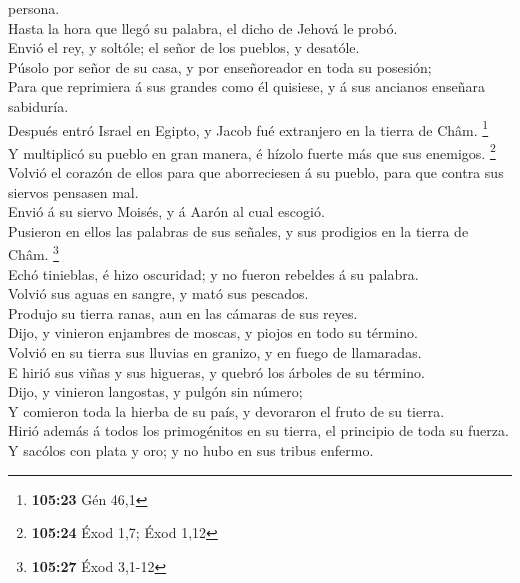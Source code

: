 persona.\\
 Hasta la hora que llegó su palabra, el dicho de Jehová
le probó.\\
 Envió el rey, y soltóle; el señor de los pueblos, y
desatóle.\\
 Púsolo por señor de su casa, y por enseñoreador en toda
su posesión;\\
 Para que reprimiera á sus grandes como él quisiese, y á
sus ancianos enseñara sabiduría.\\
 Después entró Israel en Egipto, y Jacob fué extranjero
en la tierra de Châm. \footnote{\textbf{105:23} Gén 46,1}\\
 Y multiplicó su pueblo en gran manera, é hízolo fuerte
más que sus enemigos. \footnote{\textbf{105:24} Éxod 1,7; Éxod 1,12}\\
 Volvió el corazón de ellos para que aborreciesen á su
pueblo, para que contra sus siervos pensasen mal.\\
 Envió á su siervo Moisés, y á Aarón al cual escogió.\\
 Pusieron en ellos las palabras de sus señales, y sus
prodigios en la tierra de Châm. \footnote{\textbf{105:27} Éxod 3,1-12}\\
 Echó tinieblas, é hizo oscuridad; y no fueron rebeldes á
su palabra.\\
 Volvió sus aguas en sangre, y mató sus pescados.\\
 Produjo su tierra ranas, aun en las cámaras de sus
reyes.\\
 Dijo, y vinieron enjambres de moscas, y piojos en todo
su término.\\
 Volvió en su tierra sus lluvias en granizo, y en fuego
de llamaradas.\\
 E hirió sus viñas y sus higueras, y quebró los árboles
de su término.\\
 Dijo, y vinieron langostas, y pulgón sin número;\\
 Y comieron toda la hierba de su país, y devoraron el
fruto de su tierra.\\
 Hirió además á todos los primogénitos en su tierra, el
principio de toda su fuerza.\\
 Y sacólos con plata y oro; y no hubo en sus tribus
enfermo.\\
